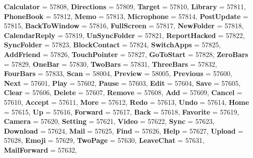 \begin{DoxyCompactItemize}
\newline
{\bfseries Calculator} = 57808, 
{\bfseries Directions} = 57809, 
{\bfseries Target} = 57810, 
{\bfseries Library} = 57811, 
\newline
{\bfseries Phone\+Book} = 57812, 
{\bfseries Memo} = 57813, 
{\bfseries Microphone} = 57814, 
{\bfseries Post\+Update} = 57815, 
\newline
{\bfseries Back\+To\+Window} = 57816, 
{\bfseries Full\+Screen} = 57817, 
{\bfseries New\+Folder} = 57818, 
{\bfseries Calendar\+Reply} = 57819, 
\newline
{\bfseries Un\+Sync\+Folder} = 57821, 
{\bfseries Report\+Hacked} = 57822, 
{\bfseries Sync\+Folder} = 57823, 
{\bfseries Block\+Contact} = 57824, 
\newline
{\bfseries Switch\+Apps} = 57825, 
{\bfseries Add\+Friend} = 57826, 
{\bfseries Touch\+Pointer} = 57827, 
{\bfseries Go\+To\+Start} = 57828, 
\newline
{\bfseries Zero\+Bars} = 57829, 
{\bfseries One\+Bar} = 57830, 
{\bfseries Two\+Bars} = 57831, 
{\bfseries Three\+Bars} = 57832, 
\newline
{\bfseries Four\+Bars} = 57833, 
{\bfseries Scan} = 58004, 
{\bfseries Preview} = 58005, 
{\bfseries Previous} = 57600, 
\newline
{\bfseries Next} = 57601, 
{\bfseries Play} = 57602, 
{\bfseries Pause} = 57603, 
{\bfseries Edit} = 57604, 
\newline
{\bfseries Save} = 57605, 
{\bfseries Clear} = 57606, 
{\bfseries Delete} = 57607, 
{\bfseries Remove} = 57608, 
\newline
{\bfseries Add} = 57609, 
{\bfseries Cancel} = 57610, 
{\bfseries Accept} = 57611, 
{\bfseries More} = 57612, 
\newline
{\bfseries Redo} = 57613, 
{\bfseries Undo} = 57614, 
{\bfseries Home} = 57615, 
{\bfseries Up} = 57616, 
\newline
{\bfseries Forward} = 57617, 
{\bfseries Back} = 57618, 
{\bfseries Favorite} = 57619, 
{\bfseries Camera} = 57620, 
\newline
{\bfseries Setting} = 57621, 
{\bfseries Video} = 57622, 
{\bfseries Sync} = 57623, 
{\bfseries Download} = 57624, 
\newline
{\bfseries Mail} = 57625, 
{\bfseries Find} = 57626, 
{\bfseries Help} = 57627, 
{\bfseries Upload} = 57628, 
\newline
{\bfseries Emoji} = 57629, 
{\bfseries Two\+Page} = 57630, 
{\bfseries Leave\+Chat} = 57631, 
{\bfseries Mail\+Forward} = 57632, 
\newline

\end{DoxyCompactItemize}
